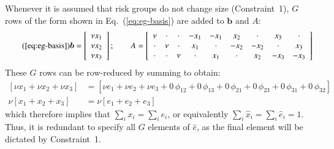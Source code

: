 Whenever it is assumed that risk groups do not change size
(Constraint~1),
$G$ rows of the form shown in Eq.~(\ref{eq:eg-basis})
are added to $\bm{b}$ and $A$:
\begin{equation}\tag{\ref{eq:eg-basis}}
\bm{b} = \left[\begin{array}{c}
\nu x_1 \\ \nu x_2 \\ \nu x_3
\end{array}\right];\qquad
A = \left[\begin{array}{ccccccccc}
 \nu  & \cdot & \cdot & -x_1  & -x_1  &  x_2  & \cdot &  x_3  & \cdot \\
\cdot &  \nu  & \cdot &  x_1  & \cdot & -x_2  & -x_2  & \cdot &  x_3  \\
\cdot & \cdot &  \nu  & \cdot &  x_1  & \cdot &  x_2  & -x_3  & -x_3  \\
\end{array}\right]
\end{equation}
These $G$ rows can be row-reduced by summing to obtain:
\begin{equation}
\begin{aligned}
\left[ \nu x_1 + \nu x_2 + \nu x_3 \right] &= 
\left[ \nu e_1 + \nu e_2 + \nu e_3
+ 0\,\phi_{12} + 0\,\phi_{13} + 0\,\phi_{21} + 0\,\phi_{23} + 0\,\phi_{31} + 0\,\phi_{32}
\right]\\
\nu \left[ x_1 + x_2 + x_3 \right] &= 
\nu \left[ e_1 + e_2 + e_3 \right]
\end{aligned}
\end{equation}
which therefore implies that $\sum_{i} x_i = \sum_{i} e_i$,
or equivalently $\sum_{i} \hat{x}_i = \sum_{i} \hat{e}_i = 1$.
Thus, it is redundant to specify all $G$ elements of $\hat{e}$,
as the final element will be dictated by Constraint~1.